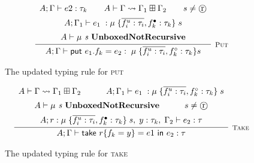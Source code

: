 \begin{figure}
    \centering
    \begin{align*}
        \infer[\textsc{\footnotesize{Put}}]{
            A;\Gamma \vdash \textsf{put } e_1.f_k  = e_2 : \; \mu \; \{ \overline{f_i^u : \tau_i}, f_k^\circ : \tau_k \} s
        }{
            \begin{array}{c}
                A;\Gamma \vdash e2 : \tau_k
                \hspace{2em}
                A \vdash \Gamma \rightsquigarrow \Gamma_1 \boxplus \Gamma_2
                \hspace{2em}
                s \neq \text{\textcircled{r}}
                \vspace{0.5em} \\
                A;\Gamma_1 \vdash e_1\; : \mu\; \{ \overline{f_i^u : \tau_i}, f_k^\bullet : \tau_k \}\; s
                \vspace{0.5em} \\
                A \vdash \mu \textit{ s } \textbf{UnboxedNotRecursive}
            \end{array}
        }
    \end{align*}
    
    \caption{The updated typing rule for \textsc{put}}
    \label{fig:puttypingrule}
\end{figure}

\begin{figure}
    \centering
    \begin{align*}
        \infer[\textsc{\footnotesize{Take}}]{
            A;\Gamma \vdash \textsf{take } r \{ f_k = y \} = e1 \textsf{ in } e_2 : \tau
        }{
            \begin{array}{c}
                A \vdash \Gamma \rightsquigarrow \Gamma_1 \boxplus \Gamma_2
                \hspace{3em}
                A;\Gamma_1 \vdash e_1\; : \mu\; \{ \overline{f_i^u : \tau_i}, f_k^\circ : \tau_k \}\; s
                \vspace{0.5em} \\
                A \vdash \mu \textit{ s } \textbf{UnboxedNotRecursive}
                \hspace{3em}
                s \neq \text{\textcircled{r}}
                \vspace{0.5em} \\
                A; r : \mu\; \{ \overline{f_i^u : \tau_i}, f_k^\bullet : \tau_k \}\; s
                ,\; y : \tau_k,\; \Gamma_2 \vdash e_2 : \tau
            \end{array}
        }
    \end{align*}
    
    \caption{The updated typing rule for \textsc{take}}
    \label{fig:taketypingrule}
\end{figure}

